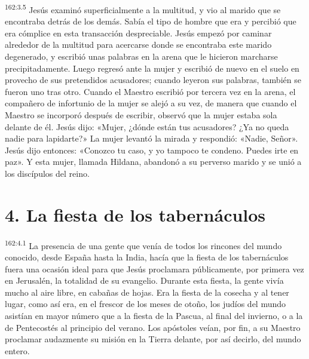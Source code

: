 \par 
\textsuperscript{162:3.5} Jesús examinó superficialmente a la multitud, y vio al marido que se encontraba detrás de los demás. Sabía el tipo de hombre que era y percibió que era cómplice en esta transacción despreciable. Jesús empezó por caminar alrededor de la multitud para acercarse donde se encontraba este marido degenerado, y escribió unas palabras en la arena que le hicieron marcharse precipitadamente. Luego regresó ante la mujer y escribió de nuevo en el suelo en provecho de sus pretendidos acusadores; cuando leyeron sus palabras, también se fueron uno tras otro. Cuando el Maestro escribió por tercera vez en la arena, el compañero de infortunio de la mujer se alejó a su vez, de manera que cuando el Maestro se incorporó después de escribir, observó que la mujer estaba sola delante de él. Jesús dijo: «Mujer, ¿dónde están tus acusadores? ¿Ya no queda nadie para lapidarte?» La mujer levantó la mirada y respondió: «Nadie, Señor». Jesús dijo entonces: «Conozco tu caso, y yo tampoco te condeno. Puedes irte en paz». Y esta mujer, llamada Hildana, abandonó a su perverso marido y se unió a los discípulos del reino.

\section*{4. La fiesta de los tabernáculos}
\par 
\textsuperscript{162:4.1} La presencia de una gente que venía de todos los rincones del mundo conocido, desde España hasta la India, hacía que la fiesta de los tabernáculos fuera una ocasión ideal para que Jesús proclamara públicamente, por primera vez en Jerusalén, la totalidad de su evangelio. Durante esta fiesta, la gente vivía mucho al aire libre, en cabañas de hojas. Era la fiesta de la cosecha y al tener lugar, como así era, en el frescor de los meses de otoño, los judíos del mundo asistían en mayor número que a la fiesta de la Pascua, al final del invierno, o a la de Pentecostés al principio del verano. Los apóstoles veían, por fin, a su Maestro proclamar audazmente su misión en la Tierra delante, por así decirlo, del mundo entero.

